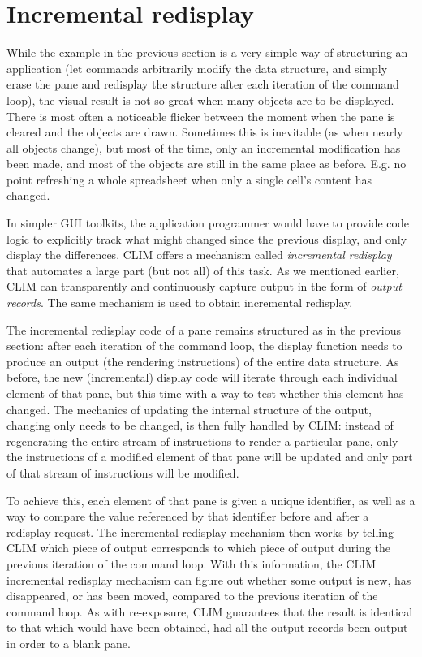 \section{Incremental redisplay}

While the example in the previous section is a very simple way of
structuring an application (let commands arbitrarily modify the data
structure, and simply erase the pane and redisplay the structure after
each iteration of the command loop), the visual result is not so great
when many objects are to be displayed.  There is most often a
noticeable flicker between the moment when the pane is cleared and the
objects are drawn.  Sometimes this is inevitable (as when nearly all
objects change), but most of the time, only an incremental
modification has been made, and most of the objects are still in the
same place as before. E.g. no point refreshing a whole spreadsheet
when only a single cell's content has changed.

In simpler GUI toolkits, the application programmer would have to
provide code logic to explicitly track what might changed since the
previous display, and only display the differences.  CLIM offers a
mechanism called \emph{incremental redisplay} that automates a large
part (but not all) of this task.  As we mentioned earlier, CLIM can
transparently and continuously capture output in the form of
\emph{output records}.  The same mechanism is used to obtain
incremental redisplay.

The incremental redisplay code of a pane remains structured as in the
previous section: after each iteration of the command loop, the
display function needs to produce an output (the rendering
instructions) of the entire data structure. As before, the new
(incremental) display code will iterate through each individual
element of that pane, but this time with a way to test whether this
element has changed. The mechanics of updating the internal structure
of the output, changing only needs to be changed, is then fully
handled by CLIM: instead of regenerating the entire stream of
instructions to render a particular pane, only the instructions of a
modified element of that pane will be updated and only part of that
stream of instructions will be modified.

To achieve this, each element of that pane is given a unique
identifier, as well as a way to compare the value referenced by that
identifier before and after a redisplay request.  The incremental
redisplay mechanism then works by telling CLIM which piece of output
corresponds to which piece of output during the previous iteration of
the command loop. With this information, the CLIM incremental
redisplay mechanism can figure out whether some output is new, has
disappeared, or has been moved, compared to the previous iteration of
the command loop.  As with re-exposure, CLIM guarantees that the
result is identical to that which would have been obtained, had all
the output records been output in order to a blank pane.


